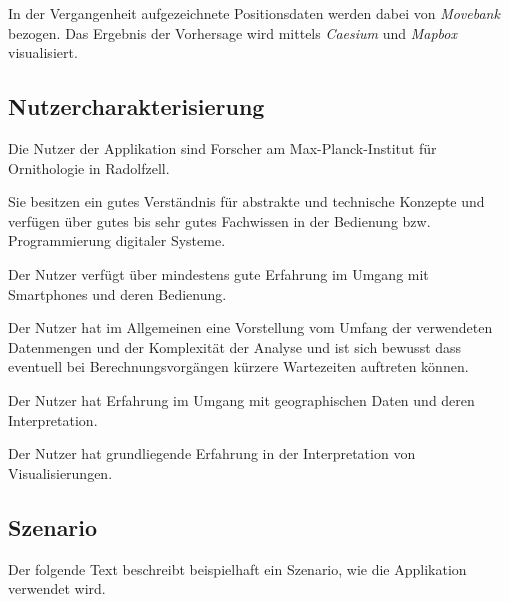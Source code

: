 \documentclass[12pt]{article} %
\begin{document}
In der Vergangenheit aufgezeichnete Positionsdaten werden dabei von \textit{Movebank} bezogen. Das Ergebnis der Vorhersage wird mittels \textit{Caesium} und \textit{Mapbox} visualisiert.


\subsection{Nutzercharakterisierung}

Die Nutzer der Applikation sind Forscher am Max-Planck-Institut für Ornithologie in Radolfzell.

Sie besitzen ein gutes Verständnis für abstrakte und technische Konzepte und verfügen über gutes bis sehr gutes Fachwissen in der Bedienung bzw. Programmierung digitaler Systeme.

Der Nutzer verfügt über mindestens gute Erfahrung im Umgang mit Smartphones und deren Bedienung.

Der Nutzer hat im Allgemeinen eine Vorstellung vom Umfang der verwendeten Datenmengen und der Komplexität der Analyse und ist sich bewusst dass eventuell bei Berechnungsvorgängen kürzere Wartezeiten auftreten können.

Der Nutzer hat Erfahrung im Umgang mit geographischen Daten und deren Interpretation.

Der Nutzer hat grundliegende Erfahrung in der Interpretation von Visualisierungen.


\subsection{Szenario}

Der folgende Text beschreibt beispielhaft ein Szenario, wie die Applikation verwendet wird.
\end{document}
